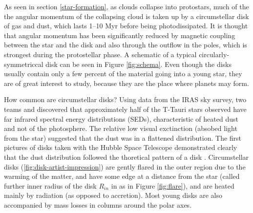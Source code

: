 As seen in section \ref{star-formation}, as clouds collapse into protostars, much of the the angular momentum of the collapsing
cloud is taken up by a circumstellar disk of gas and dust, which lasts 1–10 Myr before being photodissipated. It is thought that angular momentum has been significantly reduced by magnetic coupling between the star and the disk and also through the outflow in the poles, which is strongest during the protostellar phase. A schematic of a typical circularly-symmetriccal disk can be seen in Figure \ref{fig:schema}. Even though the disks usually contain only a few percent of the material going into a young star, they are of great interest to study, because they are the place where planets may form.

How common are circumstellar disks? Using data from the IRAS sky survey, two teams \citep{Cohen1989} and \citep{Strom1989} discovered that approximately half of the T-Tauri stars observed have far infrared spectral energy distributions (SEDs), characteristic of heated dust and not of the photosphere. The relative low visual exctinction (absobed light from the star) suggested that the dust was in a flattened distribution. The first pictures of disks taken with the Hubble Space Telescope demonstrated clearly that the dust distribution followed the thoretical pattern of a disk \citep{Bechwith1999}. Circumstellar disks (\ref{fig:disk-artist-impression}) are gently flared in the outer region due to the warming of the matter, and have some edge at a distance from the star (called further inner radius of the disk $R_{in}$ in as in Figure \ref{fig:flare}), and are heated mainly by radiation (as opposed to accretion). Most young disks are also accompanied by mass losses in columns around the polar axes.%
\vspace*{-35mm}

